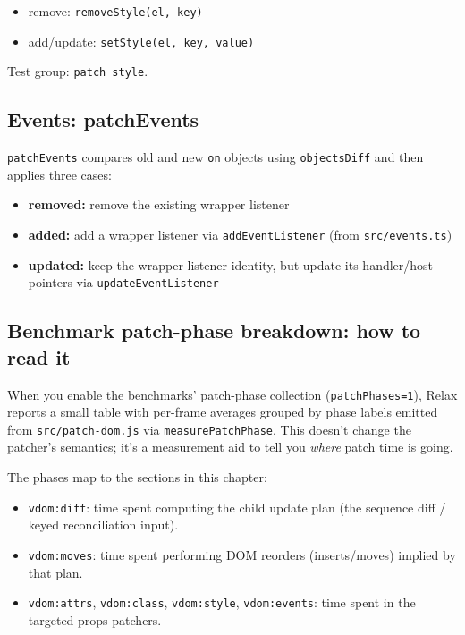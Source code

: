 \begin{itemize}
  \item remove: \texttt{removeStyle(el, key)}
  \item add/update: \texttt{setStyle(el, key, value)}
\end{itemize}

Test group: \texttt{patch style}.

\subsection{Events: patchEvents}

	\texttt{patchEvents} compares old and new \texttt{on} objects using \texttt{objectsDiff} and then applies three cases:

\begin{itemize}
  \item \textbf{removed:} remove the existing wrapper listener
  \item \textbf{added:} add a wrapper listener via \texttt{addEventListener} (from \texttt{src/events.ts})
  \item \textbf{updated:} keep the wrapper listener identity, but update its handler/host pointers via \texttt{updateEventListener}
\end{itemize}

\subsection{Benchmark patch-phase breakdown: how to read it}

When you enable the benchmarks' patch-phase collection (\texttt{patchPhases=1}), Relax reports a small table with per-frame averages grouped by phase labels emitted from \texttt{src/patch-dom.js} via \texttt{measurePatchPhase}.
This doesn't change the patcher's semantics; it's a measurement aid to tell you \emph{where} patch time is going.

The phases map to the sections in this chapter:

\begin{itemize}
  \item \texttt{vdom:diff}: time spent computing the child update plan (the sequence diff / keyed reconciliation input).
  \item \texttt{vdom:moves}: time spent performing DOM reorders (inserts/moves) implied by that plan.
  \item \texttt{vdom:attrs}, \texttt{vdom:class}, \texttt{vdom:style}, \texttt{vdom:events}: time spent in the targeted props patchers.
\end{itemize}

